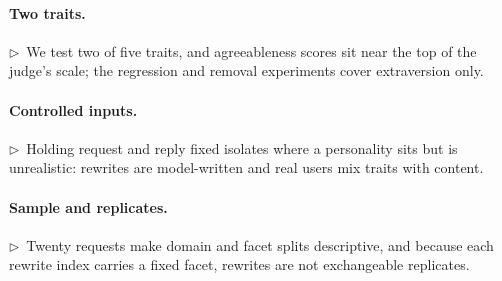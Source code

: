\documentclass[11pt]{article}
\newcommand{\flow}[1]{\par\noindent\textcolor{blue!60!black}{\small$\triangleright$\ #1}\par\medskip}
\begin{document}
\paragraph{Two traits.}
\flow{We test two of five traits, and agreeableness scores sit near the top of the judge's scale; the regression and removal experiments cover extraversion only.}

\paragraph{Controlled inputs.}
\flow{Holding request and reply fixed isolates where a personality sits but is unrealistic: rewrites are model-written and real users mix traits with content.}

\paragraph{Sample and replicates.}
\flow{Twenty requests make domain and facet splits descriptive, and because each rewrite index carries a fixed facet, rewrites are not exchangeable replicates.}

\end{document}
